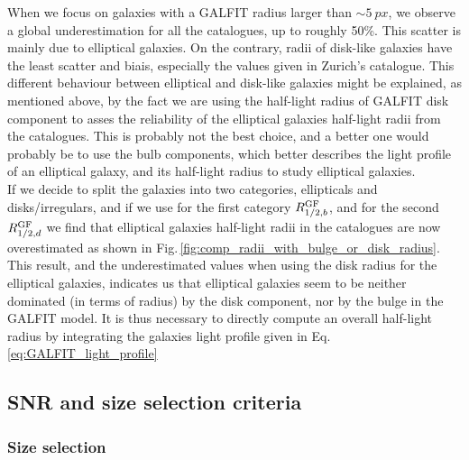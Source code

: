 When we focus on galaxies with a GALFIT radius larger than $\sim \SI{5}{px}$, we observe a global underestimation for all the catalogues, up to roughly 50\%. This scatter is mainly due to elliptical galaxies. On the contrary, radii of disk-like galaxies have the least scatter and biais, especially the values given in Zurich's catalogue. This different behaviour between elliptical and disk-like galaxies might be explained, as mentioned above, by the fact we are using the half-light radius of GALFIT disk component to asses the reliability of the elliptical galaxies half-light radii from the catalogues. This is probably not the best choice, and a better one would probably be to use the bulb components, which better describes the light profile of an elliptical galaxy, and its half-light radius to study elliptical galaxies.\\

If we decide to split the galaxies into two categories, ellipticals and disks/irregulars, and if we use for the first category $R_{1/2 , b}^{\rm{GF}}$, and for the second $R_{1/2 , d}^{\rm{GF}}$ we find that elliptical galaxies half-light radii in the catalogues are now overestimated as shown in Fig.\,\ref{fig:comp_radii_with_bulge_or_disk_radius}. This result, and the underestimated values when using the disk radius for the elliptical galaxies, indicates us that elliptical galaxies seem to be neither dominated (in terms of radius) by the disk component, nor by the bulge in the GALFIT model. It is thus necessary to directly compute an overall half-light radius by integrating the galaxies light profile given in Eq.\,\ref{eq:GALFIT_light_profile}


























\subsection{SNR and size selection criteria}

\subsubsection{Size selection}

